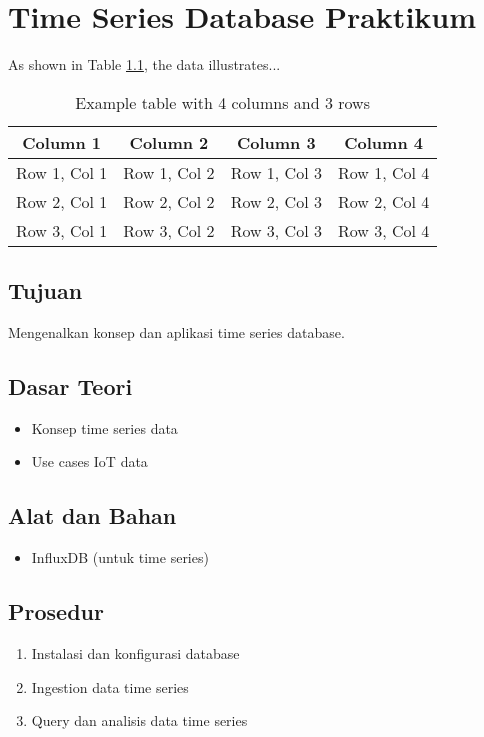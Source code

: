 \chapter{Time Series Database Praktikum}

As shown in Table \ref{tab:example-table}, the data illustrates...

\begin{table}[h]
    \centering
    \begin{tabular}{|c|c|c|c|}
        \hline
        Column 1 & Column 2 & Column 3 & Column 4 \\
        \hline
        Row 1, Col 1 & Row 1, Col 2 & Row 1, Col 3 & Row 1, Col 4 \\
        Row 2, Col 1 & Row 2, Col 2 & Row 2, Col 3 & Row 2, Col 4 \\
        Row 3, Col 1 & Row 3, Col 2 & Row 3, Col 3 & Row 3, Col 4 \\
        \hline
    \end{tabular}
    \caption{Example table with 4 columns and 3 rows}
    \label{tab:example-table}
\end{table}

\section{Tujuan}
Mengenalkan konsep dan aplikasi time series database.

\section{Dasar Teori}
\begin{itemize}
    \item Konsep time series data
    \item Use cases IoT data
\end{itemize}

\section{Alat dan Bahan}
\begin{itemize}
    \item InfluxDB (untuk time series)
\end{itemize}

\section{Prosedur}
\begin{enumerate}
    \item Instalasi dan konfigurasi database
    \item Ingestion data time series
    \item Query dan analisis data time series
\end{enumerate}

